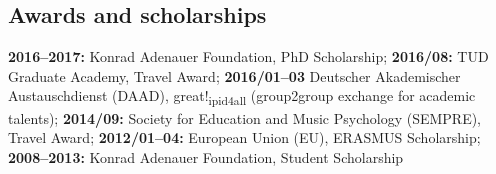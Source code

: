 
\subsection{Awards and scholarships}

\textbf{2016--2017: } Konrad Adenauer Foundation, PhD Scholarship;
\textbf{2016/08: } TUD Graduate Academy, Travel Award;
\textbf{2016/01--03} Deutscher Akademischer Austauschdienst (DAAD),
    great!\textsubscript{ipid4all} (group2group exchange for academic talents);
\textbf{2014/09: } Society for Education and Music Psychology (SEMPRE), Travel Award;
\textbf{2012/01--04: } European Union (EU), ERASMUS Scholarship;
\textbf{2008--2013: } Konrad Adenauer Foundation, Student Scholarship
